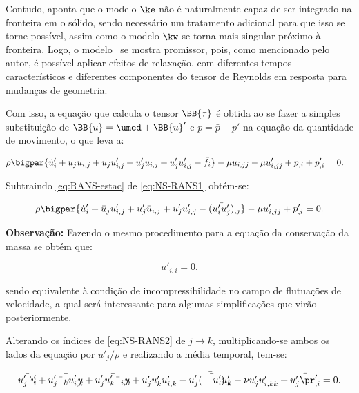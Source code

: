\documentclass[_ArquivoPrincipal.tex]{subfiles}
\begin{document}
Contudo,  aponta que o modelo $\ke$ não é naturalmente capaz de ser integrado na fronteira em o sólido, sendo necessário um tratamento adicional para que isso se torne possível, assim como o modelo $\kw$ se torna mais singular próximo à fronteira. Logo, o modelo \te\ se mostra promissor, pois, como mencionado pelo autor, é possível aplicar efeitos de relaxação, com diferentes tempos característicos e diferentes componentes do tensor de Reynolds em resposta para mudanças de geometria.

Com isso, a equação que calcula o tensor $\BB{\tau}$ é obtida ao se fazer a simples substituição de $\BB{u}=\umed+\BB{u}'$ e $p=\bar{p}+p'$ na equação da quantidade de movimento, o que leva a:

\begin{equation}
    \begin{split}
        &\rho\bigpar{\dot{u}'_i+\bar{u}_j\bar{u}_{i,j}+\bar{u}_ju'_{i,j}+u'_j\bar{u}_{i,j}+u'_ju'_{i,j}-\bar{f}_i}-\mu\bar{u}_{i,jj}-\mu u'_{i,jj}+\bar{p}_{,i}+p'_{,i}=0\text{.}
    \end{split}
    \label{eq:NS-RANS1}
\end{equation}

Subtraindo \ref{eq:RANS-estac} de \ref{eq:NS-RANS1} obtém-se:

\begin{equation}
    \rho\bigpar{\dot{u}'_i+\bar{u}_ju'_{i,j}+u'_j\bar{u}_{i,j}+u'_ju'_{i,j}-(\bar{u'_iu'_j})_{,j}}-\mu u'_{i,jj}+p'_{,i}=0\text{.}
    \label{eq:NS-RANS2}
\end{equation}

\noindent \textbf{Observação:} Fazendo o mesmo procedimento para a equação da conservação da massa se obtém que:

\begin{equation}
    u'_{i,i}=0\text{.}
\end{equation}

\noindent sendo equivalente à condição de incompressibilidade no campo de flutuações de velocidade, a qual será interessante para algumas simplificações que virão posteriormente.

Alterando os índices de \ref{eq:NS-RANS2} de $j\to k$, multiplicando-se ambos os lados da equação por $u'_j/\rho$ e realizando a média temporal, tem-se:

\begin{equation}
    \bar{u'_j\dot{u}'_i}+\bar{u'_j\bar{u}_ku'_{i,k}}+\bar{u'_ju'_k\bar{u}_{i,k}}+\bar{u'_ju'_ku'_{i,k}}-\bar{u'_j(\bar{u'_iu'_k})_{,k}}-\bar{\nu u'_ju'_{i,kk}}+\bar{u'_j\pr'_{,i}}=0\text{.}
\end{equation}
\end{document}
